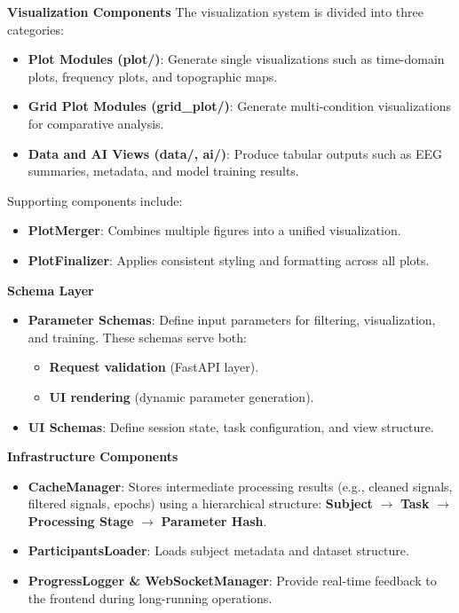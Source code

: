 \noindent\textbf{Visualization Components}
The visualization system is divided into three categories:
\begin{itemize}
    \item \textbf{Plot Modules (plot/)}: Generate single visualizations such as time-domain plots, frequency plots, and topographic maps.
    \item \textbf{Grid Plot Modules (grid\_plot/)}: Generate multi-condition visualizations for comparative analysis.
    \item \textbf{Data and AI Views (data/, ai/)}: Produce tabular outputs such as EEG summaries, metadata, and model training results.
\end{itemize}

Supporting components include:
\begin{itemize}
    \item \textbf{PlotMerger}: Combines multiple figures into a unified visualization.
    \item \textbf{PlotFinalizer}: Applies consistent styling and formatting across all plots.
\end{itemize}

\noindent\textbf{Schema Layer}
\begin{itemize}
    \item \textbf{Parameter Schemas}: Define input parameters for filtering, visualization, and training. These schemas serve both:
    \begin{itemize}
        \item \textbf{Request validation} (FastAPI layer).
        \item \textbf{UI rendering} (dynamic parameter generation).
    \end{itemize}
    \item \textbf{UI Schemas}: Define session state, task configuration, and view structure.
\end{itemize}

\noindent\noindent\textbf{Infrastructure Components}
\begin{itemize}
    \item \textbf{CacheManager}: Stores intermediate processing results (e.g., cleaned signals, filtered signals, epochs) using a hierarchical structure: \textbf{Subject} $\rightarrow$ \textbf{Task} $\rightarrow$ \textbf{Processing Stage} $\rightarrow$ \textbf{Parameter Hash}.
    \item \textbf{ParticipantsLoader}: Loads subject metadata and dataset structure.
    \item \textbf{ProgressLogger \& WebSocketManager}: Provide real-time feedback to the frontend during long-running operations.
\end{itemize}

